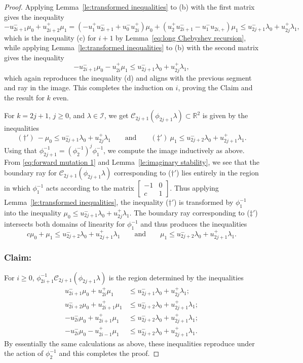 \documentclass{amsart}
\numberwithin{theorem}{section}
\newcommand{\cC}{\mathcal{C}}
\newcommand{\cI}{\mathcal{I}}
\newcommand{\RR}{\mathbb{R}}
\begin{document}
\begin{proof}
    Applying Lemma~\ref{le:transformed inequalities} to (b) with the first matrix gives the inequality 
    \[-u_{2i+1}^-\mu_0+u_{2i+2}^+\mu_1=(-u_1^+u_{2i+1}^-+u_0^-u_{2i}^+)\mu_0+(u_2^+u_{2i+1}^--u_1^-u_{2i,+})\mu_1\le u_{2j+1}^-\lambda_0+u_{2j}^+\lambda_1,\]
    which is the inequality (c) for $i+1$ by Lemma~\ref{eq:long Chebyshev recursion}, while applying Lemma~\ref{le:transformed inequalities} to (b) with the second matrix gives the inequality 
    \[-u_{2i+1}^-\mu_0-u_{2i}^+\mu_1\le u_{2j+1}^-\lambda_0+u_{2j}^+\lambda_1,\]
    which again reproduces the inequality (d) and aligns with the previous segment and ray in the image.
    This completes the induction on $i$, proving the Claim and the result for $k$ even.

    For $k=2j+1$, $j\ge0$, and $\lambda\in\cI$, we get $\cC_{2j+1}(\phi_{2j+1}\lambda)\subset\RR^2$ is given by the inequalities 
    \[ (\dagger')\ -\mu_0\le u_{2j+1}^-\lambda_0+u_{2j}^+\lambda_1 \qquad\text{and}\qquad (\ddagger')\ \mu_1\le u_{2j+2}^-\lambda_0+u_{2j+1}^+\lambda_1.\]
    Using that $\phi_{2j+1}^{-1}=\left(\phi_2^{-1}\right)^j\phi_1^{-1}$, we compute the image inductively as above.
    From \eqref{eq:forward mutation 1} and Lemma~\ref{le:imaginary stability}, we see that the boundary ray for $\cC_{2j+1}(\phi_{2j+1}\lambda)$ corresponding to ($\dagger'$) lies entirely in the region in which $\phi_1^{-1}$ acts according to the matrix $\left[ \begin{array}{cc} -1 & 0\\ c & 1 \end{array}\right]$.
    Thus applying Lemma~\ref{le:transformed inequalities}, the inequality ($\dagger'$) is transformed by $\phi_1^{-1}$ into the inequality $\mu_0\le u_{2j+1}^-\lambda_0+u_{2j}^+\lambda_1$.
    The boundary ray corresponding to ($\ddagger'$) intersects both domains of linearity for $\phi_1^{-1}$ and thus produces the inequalities
    \[ c\mu_0+\mu_1\le u_{2j+2}^-\lambda_0+u_{2j+1}^+\lambda_1 \qquad\text{and}\qquad \mu_1\le u_{2j+2}^-\lambda_0+u_{2j+1}^+\lambda_1.\]

    \subsubsection*{Claim:} For $i\ge 0$, $\phi_{2i+1}^{-1}\cC_{2j+1}(\phi_{2j+1}\lambda)$ is the region determined by the inequalities 
    \begin{align*}
      \tag{a$'$} u_{2i+1}^-\mu_0+u_{2i}^+\mu_1 &\le u_{2j+1}^-\lambda_0+u_{2j}^+\lambda_1;\\
      \tag{b$'$} u_{2i+2}^-\mu_0+u_{2i+1}^+\mu_1 &\le u_{2j+2}^-\lambda_0+u_{2j+1}^+\lambda_1;\\
      \tag{c$'$} -u_{2i}^-\mu_0+u_{2i+1}^+\mu_1 &\le u_{2j+2}^-\lambda_0+u_{2j+1}^+\lambda_1;\\
      \tag{d$'$} -u_{2i}^-\mu_0-u_{2i-1}^+\mu_1 &\le u_{2j+2}^-\lambda_0+u_{2j+1}^+\lambda_1.
    \end{align*}
    By essentially the same calculations as above, these inequalities reproduce under the action of $\phi_2^{-1}$ and this completes the proof.
  \end{proof}
\end{document}
